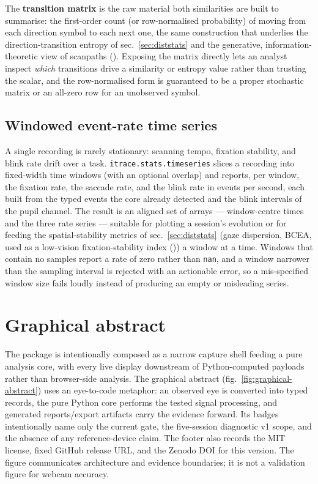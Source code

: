\documentclass[
]{article}
\begin{document}
The \textbf{transition matrix} is the raw material both similarities are
built to summarise: the first-order count (or row-normalised
probability) of moving from each direction symbol to each next one, the
same construction that underlies the direction-transition entropy of
sec.~\ref{sec:diststats} and the generative, information-theoretic view
of scanpaths (). Exposing the matrix directly lets an analyst inspect
\emph{which} transitions drive a similarity or entropy value rather than
trusting the scalar, and the row-normalised form is guaranteed to be a
proper stochastic matrix or an all-zero row for an unobserved symbol.

\subsection{Windowed event-rate time
series}\label{windowed-event-rate-time-series}

A single recording is rarely stationary: scanning tempo, fixation
stability, and blink rate drift over a task.
\texttt{itrace.stats.timeseries} slices a recording into fixed-width
time windows (with an optional overlap) and reports, per window, the
fixation rate, the saccade rate, and the blink rate in events per
second, each built from the typed events the core already detected and
the blink intervals of the pupil channel. The result is an aligned set
of arrays --- window-centre times and the three rate series --- suitable
for plotting a session's evolution or for feeding the spatial-stability
metrics of sec.~\ref{sec:diststats} (gaze dispersion, BCEA, used as a
low-vision fixation-stability index
()) a
window at a time. Windows that contain no samples report a rate of zero
rather than \texttt{nan}, and a window narrower than the sampling
interval is rejected with an actionable error, so a mis-specified window
size fails loudly instead of producing an empty or misleading series.

\section{Graphical abstract}\label{sec:graphical-abstract}

The package is intentionally composed as a narrow capture shell feeding
a pure analysis core, with every live display downstream of
Python-computed payloads rather than browser-side analysis. The
graphical abstract (fig.~\ref{fig:graphical-abstract}) uses an
eye-to-code metaphor: an observed eye is converted into typed records,
the pure Python core performs the tested signal processing, and
generated reports/export artifacts carry the evidence forward. Its
badges intentionally name only the current gate, the five-session
diagnostic v1 scope, and the absence of any reference-device claim. The
footer also records the MIT license, fixed GitHub release URL, and the
Zenodo DOI for this version. The figure communicates architecture and
evidence boundaries; it is not a validation figure for webcam accuracy.
\end{document}
